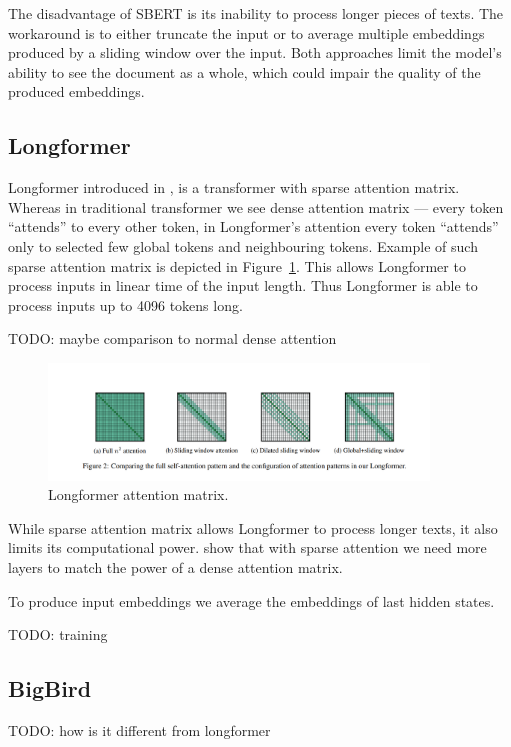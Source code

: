 The disadvantage of SBERT is its inability to process longer pieces of texts.
The workaround is to either truncate the input or to average multiple embeddings
produced by a sliding window over the input. Both approaches limit the model's
ability to see the document as a whole, which could impair the quality of the
produced embeddings.

\subsection{Longformer}

Longformer introduced in \cite{beltagy2020longformer}, is a transformer with
sparse attention matrix. Whereas in traditional transformer we see dense
attention matrix --- every token ``attends'' to every other token, in
Longformer's attention every token ``attends'' only to selected few global
tokens and neighbouring tokens. Example of such sparse attention matrix is
depicted in Figure~\ref{fig:longformer_sparse_att}. This allows Longformer to
process inputs in linear time of the input length. Thus Longformer is able to
process inputs up to 4096 tokens long.

TODO: maybe comparison to normal dense attention

\begin{figure}[h]
    \centering
    \includegraphics[width=0.9\textwidth]{./img/longformer_attention.png}
    \caption{Longformer attention matrix.\label{fig:longformer_sparse_att}}
\end{figure}

While sparse attention matrix allows Longformer to process longer texts, it also
limits its computational power. \cite{zaheer2020big} show that with sparse
attention we need more layers to match the power of a dense attention matrix.

To produce input embeddings we average the embeddings of last hidden states.

TODO: training

\subsection{BigBird}

TODO: how is it different from longformer




